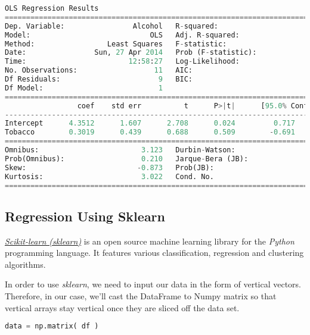 \small
\begin{lstlisting}[language=Python]
                            OLS Regression Results
==============================================================================
Dep. Variable:                Alcohol   R-squared:                       0.050
Model:                            OLS   Adj. R-squared:                 -0.056
Method:                 Least Squares   F-statistic:                    0.4735
Date:                Sun, 27 Apr 2014   Prob (F-statistic):              0.509
Time:                        12:58:27   Log-Likelihood:                -12.317
No. Observations:                  11   AIC:                             28.63
Df Residuals:                       9   BIC:                             29.43
Df Model:                           1
==============================================================================
                 coef    std err          t      P>|t|      [95.0% Conf. Int.]
------------------------------------------------------------------------------
Intercept      4.3512      1.607      2.708      0.024         0.717     7.986
Tobacco        0.3019      0.439      0.688      0.509        -0.691     1.295
==============================================================================
Omnibus:                        3.123   Durbin-Watson:                   1.655
Prob(Omnibus):                  0.210   Jarque-Bera (JB):                1.397
Skew:                          -0.873   Prob(JB):                        0.497
Kurtosis:                       3.022   Cond. No.                         25.5
==============================================================================
\end{lstlisting}
\normalsize

\subsection{Regression Using Sklearn}

\href{http://scikit-learn.org/}{\emph{Scikit-learn (sklearn)}}  is an open source machine learning library for the \emph{Python} programming language. It features various classification, regression and clustering algorithms.

In order to use \emph{sklearn}, we need to input our data in the form of vertical vectors. Therefore, in our case, we’ll cast the DataFrame to Numpy matrix so that vertical arrays stay vertical once they are sliced off the data set.

\begin{lstlisting}[language=Python]	
    data = np.matrix( df )
\end{lstlisting}

